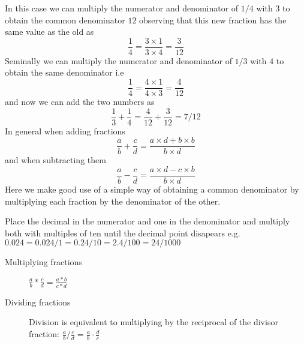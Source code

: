 In this case we can multiply the numerator and denominator of $1/4$ with $3$ to obtain the common denominator $12$ observing that this new fraction has the same value as the old as 
\[
\frac{1}{4} = \frac{3 \times 1}{3 \times 4} = \frac{3}{12}
\]
Seminally we can multiply the numerator and denominator of $1/3$ with $4$ to obtain the same denominator i.e 
\[
\frac{1}{4} = \frac{4 \times 1}{4 \times 3} = \frac{4}{12}
\] 
and now we can add the two numbers as 
\[
\frac{1}{3} + \frac{1}{4} = \frac{4}{12} + \frac{3}{12} = 7/12
\] 
In general when adding fractions
\begin{equation}
\frac{a}{b} + \frac{c}{d} = \frac{a \times d + b \times b}{b \times d}
\end{equation}
and when subtracting them 
\begin{equation}
\frac{a}{b} - \frac{c}{d} = \frac{a \times d - c \times b}{b \times d}
\end{equation}
Here we make good use of a simple way of obtaining a common denominator by multiplying each fraction by the denominator of the other. 

Place the decimal in the numerator and one in the denominator and multiply both with multiples of ten until the decimal point disapears e.g. $0.024 = 0.024/1 = 0.24/10 = 2.4/100 = 24/1000$

\begin{description}
\item [Multiplying fractions] $\frac{a}{b} * \frac{c}{d} = \frac{a*b}{c*d}$
\item [Dividing fractions] Division is equivalent to multiplying by the
reciprocal of the divisor fraction: $\frac{a}{b}/\frac{c}{d} =
\frac{a}{b} \cdot \frac{d}{c}$
\end{description}

